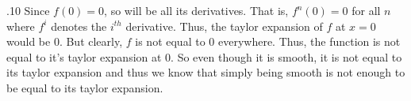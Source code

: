 \documentclass[12pt]{exam}
\begin{document}
\begin{questions}
.10 \newline
Since $f(0)=0$, so will be all its derivatives. That is, $f^n(0)=0$ for all $n$ where $f^i$ denotes the $i^{th}$ derivative. Thus, the taylor expansion of $f$ at $x=0$ would be $0$. But clearly, $f$ is not equal to $0$ everywhere. Thus, the function is not equal to it's taylor expansion at $0$. So even though it is smooth, it is not equal to its taylor expansion and thus we know that simply being smooth is not enough to be equal to its taylor expansion. 

\end{questions}
\end{document}
